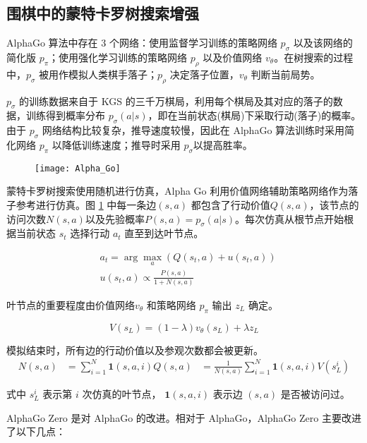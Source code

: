 \subsection{围棋中的蒙特卡罗树搜索增强}
\label{sec:AlphaGo}
AlphaGo 算法中存在 3 个网络：使用监督学习训练的策略网络 $p_\sigma$ 以及该网络的简化版 $p_\pi$；使用强化学习训练的策略网络 $p_\rho$ 以及价值网络 $v_\theta$。在树搜索的过程中，$p_\sigma$ 被用作模拟人类棋手落子；$p_\rho$ 决定落子位置，$v_\theta$ 判断当前局势。

$p_\sigma$ 的训练数据来自于 KGS 的三千万棋局，利用每个棋局及其对应的落子的数据，训练得到概率分布 $p_\sigma(a|s)$，即在当前状态(棋局)下采取行动(落子)的概率。由于 $p_\sigma$ 网络结构比较复杂，推导速度较慢，因此在 AlphaGo 算法训练时采用简化网络 $p_\pi$ 以降低训练速度；推导时采用 $p_\sigma$以提高胜率。

\begin{figure}[!htbp]
    \centering
    \texttt{[image: Alpha\_Go]}
    \label{fig:Alpha_Go}
\end{figure}

蒙特卡罗树搜索使用随机进行仿真，Alpha Go 利用价值网络辅助策略网络作为落子参考进行仿真。图 \ref{fig:Alpha_Go} 中每一条边$(s, a)$ 都包含了行动价值$Q(s,a)$，该节点的访问次数$N(s,a)$以及先验概率$P(s,a) = p_\sigma(a|s)$。每次仿真从根节点开始根据当前状态 $s_t$ 选择行动 $a_t$ 直至到达叶节点。

\begin{equation}
\begin{aligned}
&a_t = \arg\max_a(Q(s_t,a) + u(s_t,a)) \\
&u(s_t,a) \propto \frac{P(s,a)}{1+N(s,a)}
\end{aligned}
\end{equation}

叶节点的重要程度由价值网络$v_\theta$ 和策略网络 $p_\pi$ 输出 $z_L$ 确定。

$$
V(s_L) = (1-\lambda)v_\theta(s_L) + \lambda z_L
$$

模拟结束时，所有边的行动价值以及参观次数都会被更新。
$$
\begin{aligned}
N(s,a) &= \sum_{i=1}^N\mathbf{1}(s,a,i)
Q(s,a) &= \frac{1}{N(s,a)}\sum_{i=1}^N\mathbf{1}(s,a,i)V(s_L^i)
\end{aligned}
$$

式中 $s_L^i$ 表示第 $i$ 次仿真的叶节点， $\mathbf{1}(s,a,i)$ 表示边 $(s,a)$ 是否被访问过。

AlphaGo Zero 是对 AlphaGo 的改进。相对于 AlphaGo，AlphaGo Zero 主要改进了以下几点：

